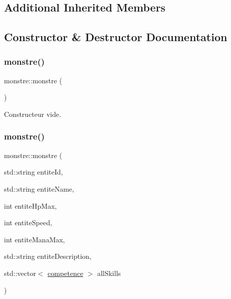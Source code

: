 \subsection*{Additional Inherited Members}


\subsection{Constructor \& Destructor Documentation}
\mbox{\label{classmonstre_a718cb1c5f9297f00e42e6b884ca85d6d}} 
\subsubsection{\texorpdfstring{monstre()}{monstre()}\hspace{0.1cm}{\footnotesize\ttfamily [1/2]}}
{\footnotesize\ttfamily monstre\+::monstre (\begin{DoxyParamCaption}{ }\end{DoxyParamCaption})\hspace{0.3cm}{\ttfamily [inline]}}



Constructeur vide. 

\mbox{\label{classmonstre_a863d9f9a553a2e3a49d16182dd004da8}} 
\subsubsection{\texorpdfstring{monstre()}{monstre()}\hspace{0.1cm}{\footnotesize\ttfamily [2/2]}}
{\footnotesize\ttfamily monstre\+::monstre (\begin{DoxyParamCaption}\item[{std\+::string}]{entite\+Id,  }\item[{std\+::string}]{entite\+Name,  }\item[{int}]{entite\+Hp\+Max,  }\item[{int}]{entite\+Speed,  }\item[{int}]{entite\+Mana\+Max,  }\item[{std\+::string}]{entite\+Description,  }\item[{std\+::vector$<$ \hyperlink{classcompetence}{competence} $>$}]{all\+Skills }\end{DoxyParamCaption})\hspace{0.3cm}{\ttfamily [inline]}}



